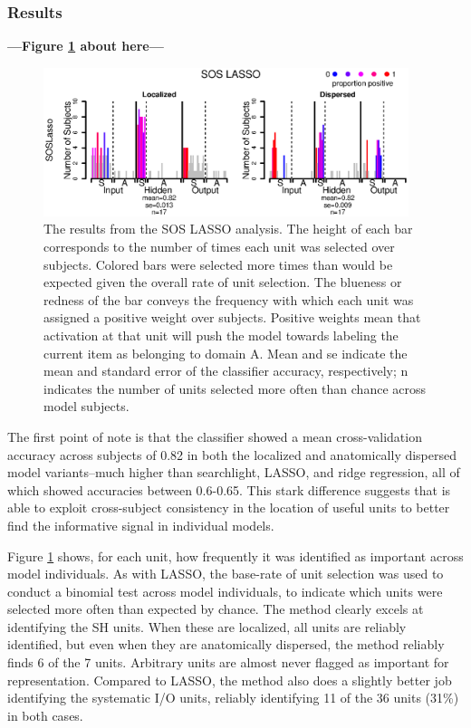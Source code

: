 \subsubsection{Results}

\begin{center}
\textbf{---Figure \ref{fig.sos} about here---}
\end{center}


\begin{figure}
\centering
\includegraphics[width=0.95\textwidth]{figures/soslasso_only.eps}
\caption{The results from the SOS LASSO analysis. The height of each bar corresponds to the number of times each unit was selected over subjects. Colored bars were selected more times than would be expected given the overall rate of unit selection. The blueness or redness of the bar conveys the frequency with which each unit was assigned a positive weight over subjects. Positive weights mean that activation at that unit will push the model towards labeling the current item as belonging to domain A. Mean and se indicate the mean and standard error of the classifier accuracy, respectively; n indicates the number of units selected more often than chance across model subjects.}
\label{fig.sos} 
\end{figure}

The first point of note is that the \soslasso classifier showed a mean cross-validation accuracy across subjects of 0.82 in both the localized and anatomically dispersed model variants--much higher than searchlight, LASSO, and ridge regression, all of which showed accuracies between 0.6-0.65. This stark difference suggests that \soslasso is able to exploit cross-subject consistency in the location of useful units to better find the informative signal in individual models.

Figure \ref{fig.sos} shows, for each unit, how frequently it was identified as important across model individuals. As with LASSO, the base-rate of unit selection was used to conduct a binomial test across model individuals, to indicate which units were selected more often than expected by chance. The method clearly excels at identifying the SH units. When these are localized, all units are reliably identified, but even when they are anatomically dispersed, the method reliably finds 6 of the 7 units. Arbitrary units are almost never flagged as important for representation. Compared to LASSO, the method also does a slightly better job identifying the systematic I/O units, reliably identifying 11 of the 36 units (31\%) in both cases.

